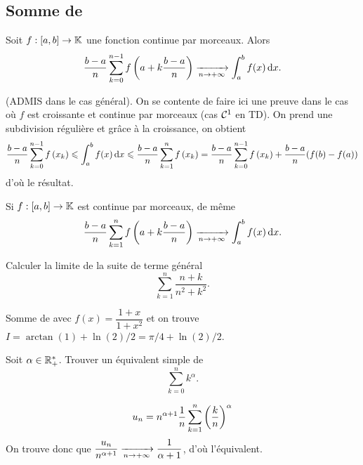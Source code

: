 \documentclass{magnolia}
\begin{document}



\subsection{Somme de }

\begin{proposition}[utile=3]
Soit $f:[a,b]\to\mathbb{K}$ une fonction continue par morceaux.  Alors
\[\frac{b-a}{n}\sum_{k=0}^{n-1} f\left(a+k\frac{b-a}{n}\right)
  \xrightarrow[n\rightarrow +\infty]{} \int_{a}^{b} f(x)\,\text{d}x.\]
\end{proposition}

\begin{preuve}
(ADMIS dans le cas général). On se contente de faire ici une preuve dans le cas où $f$ est croissante et continue par morceaux (cas $\mathcal{C}^{1}$ en TD). On prend une subdivision régulière et grâce à la croissance, on obtient $$\frac{b-a}{n}\sum_{k=0}^{n-1} f\left(x_k\right)\leqslant \int_{a}^{b} f(x)\,\text{d}x\leqslant \frac{b-a}{n}\sum_{k=1}^{n} f\left(x_k\right)=\frac{b-a}{n}\sum_{k=0}^{n-1} f\left(x_k\right)+\frac{b-a}{n}(f(b)-f(a))$$ d'où le résultat.
\end{preuve}

\begin{remarqueUnique}
\remarque[utile=-3] Si $f:[a,b]\to\mathbb{K}$ est continue par morceaux, de même
  \[\frac{b-a}{n}\sum_{k=1}^n f\left(a+k\frac{b-a}{n}\right)
    \xrightarrow[n\rightarrow +\infty]{} \int_{a}^{b} f(x)\,\text{d}x.\]
\end{remarqueUnique}

\begin{exos}
\exo[utile=3] Calculer la limite de la suite de terme général
  \[\sum_{k=1}^n \frac{n+k}{n^2+k^2}.\]
  \begin{sol}
  Somme de  avec $f(x)=\dfrac{1+x}{1+x^2}$ et on trouve $I=\arctan(1)+\ln(2)/2=\pi/4+\ln(2)/2$.
  \end{sol}
\exo[utile=3] Soit $\alpha\in\mathbb{R}_+^*$. Trouver un équivalent simple de
  \[\sum_{k=0}^n k^\alpha.\]
  \begin{sol}
  $$u_n=n^{\alpha+1}\frac{1}{n}\sum_{k=1}^n\left(\frac{k}{n}\right)^\alpha$$
  On trouve donc que $\dfrac{u_n}{n^{\alpha+1}}\xrightarrow[n\rightarrow +\infty]{}\dfrac{1}{\alpha+1}$, d'où l'équivalent.
  \end{sol}
\end{exos}
\end{document}
